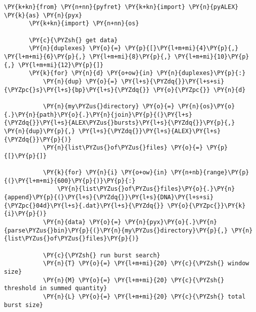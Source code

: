 \begin{Verbatim}[commandchars=\\\{\}, fontsize=\scriptsize]
       \PY{k+kn}{from} \PY{n+nn}{pyfret} \PY{k+kn}{import} \PY{n}{pyALEX} \PY{k}{as} \PY{n}{pyx}
       \PY{k+kn}{import} \PY{n+nn}{os}
       
       \PY{c}{\PYZsh{} get data}
       \PY{n}{duplexes} \PY{o}{=} \PY{p}{[}\PY{l+m+mi}{4}\PY{p}{,} \PY{l+m+mi}{6}\PY{p}{,} \PY{l+m+mi}{8}\PY{p}{,} \PY{l+m+mi}{10}\PY{p}{,} \PY{l+m+mi}{12}\PY{p}{]}
       \PY{k}{for} \PY{n}{d} \PY{o+ow}{in} \PY{n}{duplexes}\PY{p}{:}
           \PY{n}{dup} \PY{o}{=} \PY{l+s}{\PYZdq{}}\PY{l+s+si}{\PYZpc{}s}\PY{l+s}{bp}\PY{l+s}{\PYZdq{}} \PY{o}{\PYZpc{}} \PY{n}{d}
       
           \PY{n}{my\PYZus{}directory} \PY{o}{=} \PY{n}{os}\PY{o}{.}\PY{n}{path}\PY{o}{.}\PY{n}{join}\PY{p}{(}\PY{l+s}{\PYZdq{}}\PY{l+s}{ALEX\PYZus{}bursts}\PY{l+s}{\PYZdq{}}\PY{p}{,} \PY{n}{dup}\PY{p}{,} \PY{l+s}{\PYZdq{}}\PY{l+s}{ALEX}\PY{l+s}{\PYZdq{}}\PY{p}{)}
           \PY{n}{list\PYZus{}of\PYZus{}files} \PY{o}{=} \PY{p}{[}\PY{p}{]}
           
           \PY{k}{for} \PY{n}{i} \PY{o+ow}{in} \PY{n+nb}{range}\PY{p}{(}\PY{l+m+mi}{600}\PY{p}{)}\PY{p}{:}
               \PY{n}{list\PYZus{}of\PYZus{}files}\PY{o}{.}\PY{n}{append}\PY{p}{(}\PY{l+s}{\PYZdq{}}\PY{l+s}{DNA}\PY{l+s+si}{\PYZpc{}04d}\PY{l+s}{.dat}\PY{l+s}{\PYZdq{}} \PY{o}{\PYZpc{}}\PY{k}{i}\PY{p}{)}
           \PY{n}{data} \PY{o}{=} \PY{n}{pyx}\PY{o}{.}\PY{n}{parse\PYZus{}bin}\PY{p}{(}\PY{n}{my\PYZus{}directory}\PY{p}{,} \PY{n}{list\PYZus{}of\PYZus{}files}\PY{p}{)}
       
           \PY{c}{\PYZsh{} run burst search}
           \PY{n}{T} \PY{o}{=} \PY{l+m+mi}{20} \PY{c}{\PYZsh{} window size}
           \PY{n}{M} \PY{o}{=} \PY{l+m+mi}{20} \PY{c}{\PYZsh{} threshold in summed quantity}
           \PY{n}{L} \PY{o}{=} \PY{l+m+mi}{20} \PY{c}{\PYZsh{} total burst size}
       

\end{Verbatim}
